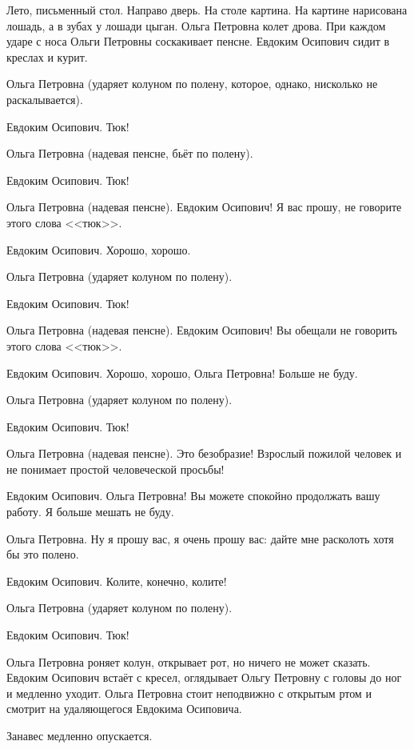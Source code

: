 Лето, письменный стол. Направо дверь. На столе картина. На картине нарисована лошадь, а в зубах у лошади цыган. Ольга Петровна колет дрова. При каждом ударе с носа Ольги Петровны соскакивает пенсне. Евдоким Осипович сидит в креслах и курит.

Ольга Петровна (ударяет колуном по полену, которое, однако, нисколько не раскалывается).

Евдоким Осипович. Тюк!

Ольга Петровна (надевая пенсне, бьёт по полену).

Евдоким Осипович. Тюк!

Ольга Петровна (надевая пенсне). Евдоким Осипович! Я вас прошу, не говорите этого слова <<тюк>>.

Евдоким Осипович. Хорошо, хорошо.

Ольга Петровна (ударяет колуном по полену).

Евдоким Осипович. Тюк!

Ольга Петровна (надевая пенсне). Евдоким Осипович! Вы обещали не говорить этого слова <<тюк>>.

Евдоким Осипович. Хорошо, хорошо, Ольга Петровна! Больше не буду.

Ольга Петровна (ударяет колуном по полену).

Евдоким Осипович. Тюк!

Ольга Петровна (надевая пенсне). Это безобразие! Взрослый пожилой человек и не понимает простой человеческой просьбы!

Евдоким Осипович. Ольга Петровна! Вы можете спокойно продолжать вашу работу. Я больше мешать не буду.

Ольга Петровна. Ну я прошу вас, я очень прошу вас: дайте мне расколоть хотя бы это полено.

Евдоким Осипович. Колите, конечно, колите!

Ольга Петровна (ударяет колуном по полену).

Евдоким Осипович. Тюк!

Ольга Петровна роняет колун, открывает рот, но ничего не может сказать. Евдоким Осипович встаёт с кресел, оглядывает Ольгу Петровну с головы до ног и медленно уходит. Ольга Петровна стоит неподвижно с открытым ртом и смотрит на удаляющегося Евдокима Осиповича.

Занавес медленно опускается.